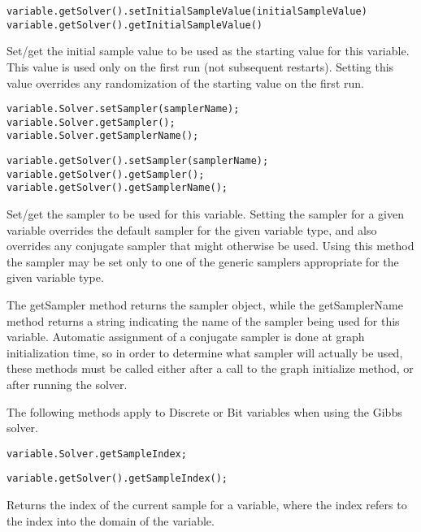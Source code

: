 \ifjava
\begin{lstlisting}
variable.getSolver().setInitialSampleValue(initialSampleValue)
variable.getSolver().getInitialSampleValue()
\end{lstlisting}
\fi

Set/get the initial sample value to be used as the starting value for this variable.  This value is used only on the first run (not subsequent restarts).  Setting this value overrides any randomization of the starting value on the first run.


\ifmatlab
\begin{lstlisting}
variable.Solver.setSampler(samplerName);
variable.Solver.getSampler();
variable.Solver.getSamplerName();
\end{lstlisting}
\fi

\ifjava
\begin{lstlisting}
variable.getSolver().setSampler(samplerName);
variable.getSolver().getSampler();
variable.getSolver().getSamplerName();
\end{lstlisting}
\fi

Set/get the sampler to be used for this variable.  Setting the sampler for a given variable overrides the default sampler for the given variable type, and also overrides any conjugate sampler that might otherwise be used.  Using this method the sampler may be set only to one of the generic samplers appropriate for the given variable type.

The getSampler method returns the sampler object, while the getSamplerName method returns a string indicating the name of the sampler being used for this variable.  Automatic assignment of a conjugate sampler is done at graph initialization time, so in order to determine what sampler will actually be used, these methods must be called either after a call to the graph initialize method, or after running the solver.



The following methods apply to Discrete or Bit variables when using the Gibbs solver.

\ifmatlab
\begin{lstlisting}
variable.Solver.getSampleIndex;
\end{lstlisting}
\fi

\ifjava
\begin{lstlisting}
variable.getSolver().getSampleIndex();
\end{lstlisting}
\fi

Returns the index of the current sample for a variable, where the index refers to the index into the domain of the variable.

